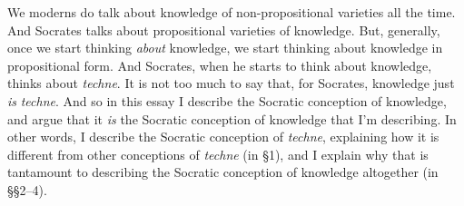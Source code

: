 ﻿\documentclass[11pt]{amsart}
\begin{document}








We moderns do talk about knowledge of non-propositional varieties all the time. And Socrates talks about propositional varieties of knowledge. But, generally, once we start thinking \emph{about} knowledge, we start thinking about knowledge in propositional form. And Socrates, when he starts to think about knowledge, thinks about \emph{techne}. It is not too much to say that, for Socrates, knowledge just \emph{is} \emph{techne}. And so in this essay I describe the Socratic conception of knowledge, and argue that it \emph{is} the Socratic conception of knowledge that I'm describing. In other words, I describe the Socratic conception of \emph{techne}, explaining how it is different from other conceptions of \emph{techne} (in \S1), and I explain why that is tantamount to describing the Socratic conception of knowledge altogether (in \S\S2--4).









\end{document}
